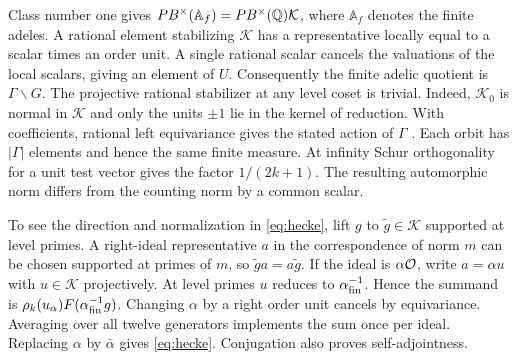 Class number one gives
\(PB^\times(\mathbb A_f)=PB^\times(\mathbb Q)\mathcal K\), where
\(\mathbb A_f\) denotes the finite adeles. A rational element
stabilizing \(\mathcal K\) has a representative locally equal to
a scalar times an order unit. A single rational scalar cancels
the valuations of the local scalars, giving an element of \(U\).
Consequently the finite adelic quotient is \(\Gamma\backslash G\).
The projective rational stabilizer at any level coset is trivial.
Indeed, \(\mathcal K_0\) is normal in \(\mathcal K\) and only the
units \(\pm1\) lie in the kernel of reduction. With coefficients,
rational left equivariance gives the stated action of \(\Gamma\)
\cite[Section~2, (4)--(6) and Proposition~2.5]{GV}.
Each orbit has \(|\Gamma|\) elements and hence the same finite
measure. At infinity Schur orthogonality for a unit test vector
gives the factor \(1/(2k+1)\). The resulting automorphic norm
differs from the counting norm by a common scalar.

To see the direction and normalization in \eqref{eq:hecke},
lift \(g\) to \(\tilde g\in\mathcal K\) supported at level primes.
A right-ideal representative \(a\) in the correspondence of norm
\(m\) can be chosen supported at primes of \(m\), so
\(\tilde g a=a\tilde g\). If the ideal is \(\alpha\mathcal O\), write
\(a=\alpha u\) with \(u\in\mathcal K\) projectively. At level primes
\(u\) reduces to \(\alpha_{\rm fin}^{-1}\). Hence the summand is
\(\rho_k(u_\alpha)F(\alpha_{\rm fin}^{-1}g)\).
Changing \(\alpha\) by a right order unit cancels by equivariance.
Averaging over all twelve generators implements the sum once per
ideal. Replacing \(\alpha\) by \(\bar\alpha\) gives
\eqref{eq:hecke}. Conjugation also proves self-adjointness.

